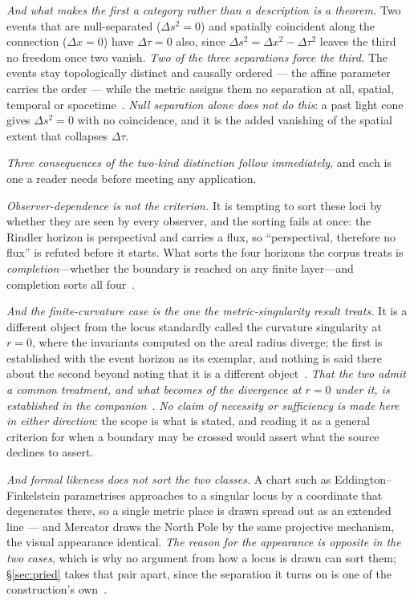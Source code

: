 \documentclass[11pt,a4paper]{article}
\theoremstyle{plain}
\theoremstyle{definition}
\begin{document}
\emph{And what makes the first a category rather than a description is a theorem.} Two events that are
null-separated ($\Delta s^{2}=0$) and spatially coincident along the connection ($\Delta x=0$) have
$\Delta\tau=0$ also, since $\Delta s^{2}=\Delta x^{2}-\Delta\tau^{2}$ leaves the third no freedom once two
vanish. \emph{Two of the three separations force the third.} The events stay topologically distinct and
causally ordered --- the affine parameter carries the order --- while the metric assigns them no separation
at all, spatial, temporal or spacetime~\cite{JanzenBHcausality}. \emph{Null separation alone does not do
this}: a past light cone gives $\Delta s^{2}=0$ with no coincidence, and it is the added vanishing of the
spatial extent that collapses $\Delta\tau$.

\emph{Three consequences of the two-kind distinction follow immediately}, and each is one a reader needs
before meeting any application.

\emph{Observer-dependence is not the criterion.} It is tempting to sort these loci by whether they are seen
by every observer, and the sorting fails at once: the Rindler horizon is perspectival and carries a flux, so
``perspectival, therefore no flux'' is refuted before it starts. What sorts the four horizons the corpus
treats is \emph{completion}---whether the boundary is reached on any finite layer---and completion sorts all
four~\cite{JanzenBHcausality}.

\emph{And the finite-curvature case is the one the metric-singularity result treats.} It is a different
object from the locus standardly called the curvature singularity at $r=0$, where the invariants computed on
the areal radius diverge; the first is established with the event horizon as its exemplar, and nothing is
said there about the second beyond noting that it is a different object~\cite{JanzenBHcausality}. \emph{That
the two admit a common treatment, and what becomes of the divergence at $r=0$ under it, is established in the
companion}~\cite{JanzenCircle,JanzenSlicing}. \emph{No claim of necessity or sufficiency is made here in
either direction}: the scope is what is stated, and reading it as a general criterion for when a boundary may
be crossed would assert what the source declines to assert.

\emph{And formal likeness does not sort the two classes.} A chart such as Eddington--Finkelstein parametrises
approaches to a singular locus by a coordinate that degenerates there, so a single metric place is drawn
spread out as an extended line --- and Mercator draws the North Pole by the same projective mechanism, the
visual appearance identical. \emph{The reason for the appearance is opposite in the two cases}, which is why
no argument from how a locus is drawn can sort them; \S\ref{sec:pried} takes that pair apart, since the
separation it turns on is one of the construction's own~\cite{JanzenCircle}.
\end{document}
